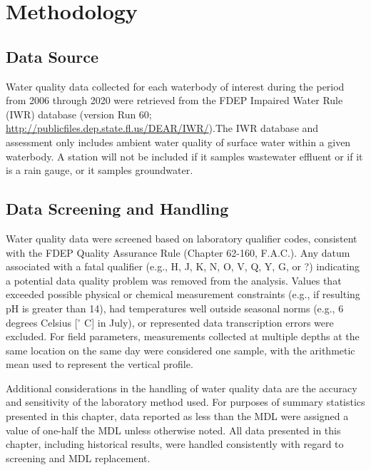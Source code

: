 \documentclass[]{interact}
\theoremstyle{plain}%
\theoremstyle{definition}
\theoremstyle{remark}
\begin{document}
\hypertarget{methodology}{%
\section{Methodology}\label{methodology}}

\hypertarget{data-source}{%
\subsection{Data Source}\label{data-source}}

Water quality data collected for each waterbody of interest during the
period from 2006 through 2020 were retrieved from the FDEP Impaired
Water Rule (IWR) database (version Run 60;
\url{http://publicfiles.dep.state.fl.us/DEAR/IWR/}).The IWR database and
assessment only includes ambient water quality of surface water within a
given waterbody. A station will not be included if it samples wastewater
effluent or if it is a rain gauge, or it samples groundwater.

\hypertarget{data-screening-and-handling}{%
\subsection{Data Screening and
Handling}\label{data-screening-and-handling}}

Water quality data were screened based on laboratory qualifier codes,
consistent with the FDEP Quality Assurance Rule (Chapter 62-160,
F.A.C.). Any datum associated with a fatal qualifier (e.g., H, J, K, N,
O, V, Q, Y, G, or ?) indicating a potential data quality problem was
removed from the analysis. Values that exceeded possible physical or
chemical measurement constraints (e.g., if resulting pH is greater than
14), had temperatures well outside seasonal norms (e.g., 6 degrees
Celsius {[}\(^\circ\) C{]} in July), or represented data transcription
errors were excluded. For field parameters, measurements collected at
multiple depths at the same location on the same day were considered one
sample, with the arithmetic mean used to represent the vertical profile.

Additional considerations in the handling of water quality data are the
accuracy and sensitivity of the laboratory method used. For purposes of
summary statistics presented in this chapter, data reported as less than
the MDL were assigned a value of one-half the MDL unless otherwise
noted. All data presented in this chapter, including historical results,
were handled consistently with regard to screening and MDL replacement.
\end{document}

